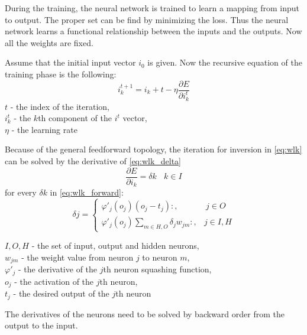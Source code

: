 During the training, the neural network is trained to learn a mapping from input to output. The proper set can be find by minimizing the loss. Thus the neural network learns a functional relationship between the inputs and the outputs. Now all the weights are fixed. \medskip

Assume that the initial input vector $i_0$ is given. Now the recursive equation of the training phase is the following: 
\begin{equation} i_k^{t+1} = i_k+t - \eta \frac{\partial E}{\partial i_k^t} \label{eq:wlk} \end{equation} 
$t$ - the index of the iteration, \\
$i_k^t$ - the $k$th component of the $i^t$ vector, \\
$\eta$ - the learning rate \bigskip

Because of the general feedforward topology, the iteration for inversion in \eqref{eq:wlk} can be solved by the derivative of \eqref{eq:wlk_delta}
\begin{equation} \frac{\partial E}{\partial i_k} = \delta k ~~~~ k \in I \label{eq:wlk_delta} \end{equation}
for every $\delta k$ in \eqref{eq:wlk_forward}:
\begin{equation} \delta j = \begin{cases} \varphi'_j(o_j)(o_j-t_j):, & ~ j \in O \\ 
\varphi'_j(o_j)\sum_{m\in H,O}\delta_j w_{jm}:, & j \in I, H \end{cases} \label{eq:wlk_forward} \end{equation}

\noindent $I, O, H$ - the set of input, output and hidden neurons,\\
$w_{jm}$ - the weight value from neuron $j$ to neuron $m$,\\
$\varphi'_j$ - the derivative of the $j$th neuron squashing function,\\
$o_j$ - the activation of the $j$th neuron,\\
$t_j$ - the desired output of the $j$th neuron \bigskip

The derivatives of the neurons need to be solved by backward order from the output to the input.

